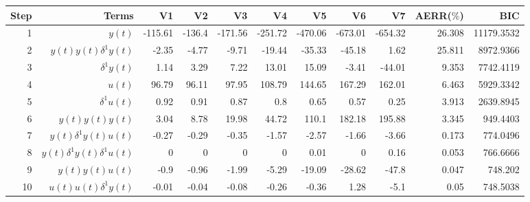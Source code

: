 \begin{tabular}{rrrrrrrrrrr}
Step & Terms & V1 & V2 & V3 & V4 & V5 & V6 & V7 & AERR($\%$) & BIC \\ 
\hline 
1 & $y(t)$ & -115.61 & -136.4 & -171.56 & -251.72 & -470.06 & -673.01 & -654.32 & 26.308 & 11179.3532 \\ 
2 & $y(t)y(t)\delta^1 y(t)$ & -2.35 & -4.77 & -9.71 & -19.44 & -35.33 & -45.18 & 1.62 & 25.811 & 8972.9366 \\ 
3 & $\delta^1 y(t)$ & 1.14 & 3.29 & 7.22 & 13.01 & 15.09 & -3.41 & -44.01 & 9.353 & 7742.4119 \\ 
4 & $u(t)$ & 96.79 & 96.11 & 97.95 & 108.79 & 144.65 & 167.29 & 162.01 & 6.463 & 5929.3342 \\ 
5 & $\delta^1 u(t)$ & 0.92 & 0.91 & 0.87 & 0.8 & 0.65 & 0.57 & 0.25 & 3.913 & 2639.8945 \\ 
6 & $y(t)y(t)y(t)$ & 3.04 & 8.78 & 19.98 & 44.72 & 110.1 & 182.18 & 195.88 & 3.345 & 949.4403 \\ 
7 & $y(t)\delta^1 y(t)u(t)$ & -0.27 & -0.29 & -0.35 & -1.57 & -2.57 & -1.66 & -3.66 & 0.173 & 774.0496 \\ 
8 & $y(t)\delta^1 y(t)\delta^1 u(t)$ & 0 & 0 & 0 & 0 & 0.01 & 0 & 0.16 & 0.053 & 766.6666 \\ 
9 & $y(t)y(t)u(t)$ & -0.9 & -0.96 & -1.99 & -5.29 & -19.09 & -28.62 & -47.8 & 0.047 & 748.202 \\ 
10 & $u(t)u(t)\delta^1 y(t)$ & -0.01 & -0.04 & -0.08 & -0.26 & -0.36 & 1.28 & -5.1 & 0.05 & 748.5038 \\ 
\hline 
\end{tabular}